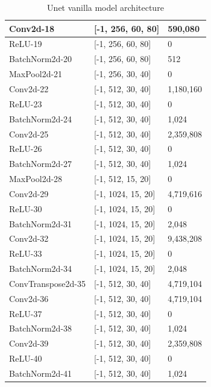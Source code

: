 \begin{table}[]
\begin{center}
\begin{tabular}{| l | l | p{3cm} |}
    			Conv2d-18          & {[}-1, 256, 60, 80{]}   & 590,080   \\ \hline
    			ReLU-19            & {[}-1, 256, 60, 80{]}   & 0         \\ \hline
    			BatchNorm2d-20     & {[}-1, 256, 60, 80{]}   & 512       \\ \hline
    			MaxPool2d-21       & {[}-1, 256, 30, 40{]}   & 0         \\ \hline
    			Conv2d-22          & {[}-1, 512, 30, 40{]}   & 1,180,160 \\ \hline
    			ReLU-23            & {[}-1, 512, 30, 40{]}   & 0         \\ \hline
    			BatchNorm2d-24     & {[}-1, 512, 30, 40{]}   & 1,024     \\ \hline
    			Conv2d-25          & {[}-1, 512, 30, 40{]}   & 2,359,808 \\ \hline
    			ReLU-26            & {[}-1, 512, 30, 40{]}   & 0         \\ \hline
    			BatchNorm2d-27     & {[}-1, 512, 30, 40{]}   & 1,024     \\ \hline
    			MaxPool2d-28       & {[}-1, 512, 15, 20{]}   & 0         \\ \hline
    			Conv2d-29          & {[}-1, 1024, 15, 20{]}  & 4,719,616 \\ \hline
    			ReLU-30            & {[}-1, 1024, 15, 20{]}  & 0         \\ \hline
    			BatchNorm2d-31     & {[}-1, 1024, 15, 20{]}  & 2,048     \\ \hline
    			Conv2d-32          & {[}-1, 1024, 15, 20{]}  & 9,438,208 \\ \hline
    			ReLU-33            & {[}-1, 1024, 15, 20{]}  & 0         \\ \hline
    			BatchNorm2d-34     & {[}-1, 1024, 15, 20{]}  & 2,048     \\ \hline
    			ConvTranspose2d-35 & {[}-1, 512, 30, 40{]}   & 4,719,104 \\ \hline
    			Conv2d-36          & {[}-1, 512, 30, 40{]}   & 4,719,104 \\ \hline
    			ReLU-37            & {[}-1, 512, 30, 40{]}   & 0         \\ \hline
    			BatchNorm2d-38     & {[}-1, 512, 30, 40{]}   & 1,024     \\ \hline
    			Conv2d-39          & {[}-1, 512, 30, 40{]}   & 2,359,808 \\ \hline
    			ReLU-40            & {[}-1, 512, 30, 40{]}   & 0         \\ \hline
    			BatchNorm2d-41     & {[}-1, 512, 30, 40{]}   & 1,024     \\ \hline

    		\end{tabular}
    		\caption{Unet vanilla model architecture}
    		\label{table:unet_vanilla_model_1}
    	\end{center}
    \end{table}
    
